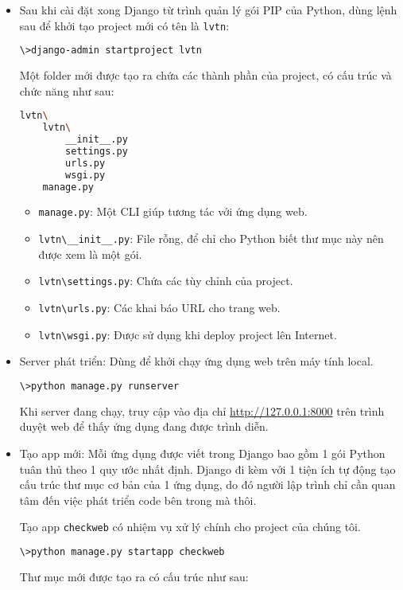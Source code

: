 \begin{itemize}
	\item Sau khi cài đặt xong Django từ trình quản lý gói PIP của Python, dùng lệnh sau để khởi tạo project mới có tên là \texttt{lvtn}:
	\begin{lstlisting}[language=bash]
\>django-admin startproject lvtn
	\end{lstlisting}
	Một folder mới được tạo ra chứa các thành phần của project, có cấu trúc và chức năng như sau:
	\begin{lstlisting}[language=bash]
lvtn\
	lvtn\
		__init__.py
		settings.py
		urls.py
		wsgi.py
	manage.py
	\end{lstlisting}
	\begin{itemize}
		\item \texttt{manage.py}: Một CLI giúp tương tác với ứng dụng web.
		\item \texttt{lvtn\textbackslash\_\_init\_\_.py}: File rỗng, để chỉ cho Python biết thư mục này nên được xem là một gói.
		\item \texttt{lvtn\textbackslash settings.py}: Chứa các tùy chỉnh của project.
		\item \texttt{lvtn\textbackslash urls.py}: Các khai báo URL cho trang web.
		\item \texttt{lvtn\textbackslash wsgi.py}: Được sử dụng khi deploy project lên Internet.
	\end{itemize}
	\item Server phát triển: Dùng để khởi chạy ứng dụng web trên máy tính local.
	\begin{lstlisting}[language=bash]
\>python manage.py runserver
	\end{lstlisting}
	Khi server đang chạy, truy cập vào địa chỉ \url{http://127.0.0.1:8000} trên trình duyệt web để thấy ứng dụng đang được trình diễn.
	\item Tạo app mới: Mỗi ứng dụng được viết trong Django bao gồm 1 gói Python tuân thủ theo 1 quy ước nhất định. Django đi kèm với 1 tiện ích tự động tạo cấu trúc thư mục cơ bản của 1 ứng dụng, do đó người lập trình chỉ cần quan tâm đến việc phát triển code bên trong mà thôi.
	\\\par
	Tạo app \texttt{checkweb}	có nhiệm vụ xử lý chính cho project của chúng tôi.
	\begin{lstlisting}[language=bash]
\>python manage.py startapp checkweb
	\end{lstlisting}
	Thư mục mới được tạo ra có cấu trúc như sau:
	\begin{lstlisting}[language=bash]

\end{lstlisting}
\end{itemize}
